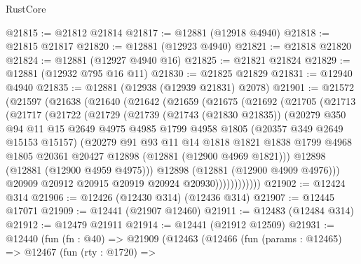 \begin{lexlean}{RustCore}
\begin{coremodule}
@21815 := @21812 @21814
@21817 := @12881 (@12918 @4940)
@21818 := @21815 @21817
@21820 := @12881 (@12923 @4940)
@21821 := @21818 @21820
@21824 := @12881 (@12927 @4940 @16)
@21825 := @21821 @21824
@21829 := @12881 (@12932 @795 @16 @11)
@21830 := @21825 @21829
@21831 := @12940 @4940
@21835 := @12881 (@12938 (@12939 @21831) @2078)
@21901 := @21572
    (@21597
      (@21638
        (@21640
          (@21642
            (@21659
              (@21675
                (@21692
                  (@21705
                    (@21713
                      (@21717
                        (@21722
                          (@21729
                            (@21739
                              (@21743 (@21830 @21835))
                              (@20279
                                @350
                                @94
                                @11
                                @15
                                @2649
                                @4975
                                @4985
                                @1799
                                @4958
                                @1805
                                (@20357 @349 @2649 @15153 @15157)
                                (@20279
                                  @91
                                  @93
                                  @11
                                  @14
                                  @1818
                                  @1821
                                  @1838
                                  @1799
                                  @4968
                                  @1805
                                  @20361
                                  @20427
                                  @12898
                                  (@12881 (@12900 @4969 @1821)))
                                @12898
                                (@12881 (@12900 @4959 @4975)))
                              @12898
                              (@12881 (@12900 @4909 @4976)))
                            @20909
                            @20912
                            @20915
                            @20919
                            @20924
                            @20930))))))))))))
@21902 := @12424 @314
@21906 := @12426 (@12430 @314) (@12436 @314)
@21907 := @12445 @17071
@21909 := @12441 (@21907 @12460)
@21911 := @12483 (@12484 @314)
@21912 := @12479 @21911
@21914 := @12441 (@21912 @12509)
@21931 := @12440
    (fun (fn : @40) =>
    @21909
      (@12463
        (@12466
          (fun (params : @12465) =>
          @12467
            (fun (rty : @1720) =>

\end{coremodule}
\end{lexlean}
